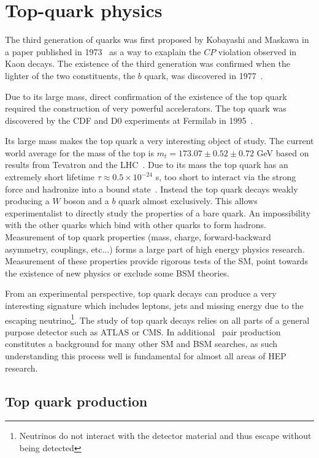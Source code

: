 \chapter{Top-quark physics} \label{sec:top_quark_physics}
The third generation of quarks was first proposed by Kobayashi and Maskawa in a paper published in 1973~\cite{Theory:CKMKobayashiMaskawa} as a way to exaplain the $CP$ violation observed in Kaon decays. The existence of the third generation was confirmed when the lighter of the two constituents, the $b$ quark, was discovered in 1977~\cite{Top:bQuarkDiscovered}.

Due to its large mass, direct confirmation of the existence of the top quark required the construction of very powerful accelerators. The top quark was discovered by the CDF and D0 experiments at Fermilab in 1995~\cite{Top:ObservationCDF,Top:ObservationD0}.

Its large mass makes the top quark a very interesting object of study. The current world average for the mass of the top is $m_{t}=173.07\pm0.52\pm0.72$ GeV based on results from Tevatron and the LHC~\cite{Theory:PDGBooklet}. Due to its mass the top quark has an extremely short lifetime $\tau\approx0.5\times10^{-24}$ s, too short to interact via the strong force and hadronize into a bound state~\cite{Theory:TopQuarkDecayTooQuickly}. Instead the top quark decays weakly producing a $W$ boson and a $b$ quark almost exclusively. This allows experimentalist to directly study the properties of a bare quark. An impossibility with the other quarks which bind with other quarks to form hadrons. Measurement of top quark properties (mass, charge, forward-backward asymmetry, couplings, etc...) forms a large part of high energy physics research. Measurement of these properties provide rigorous tests of the SM, point towards the existence of new physics or exclude some BSM theories.

From an experimental perspective, top quark decays can produce a very interesting signature which includes leptons, jets and missing energy due to the escaping neutrino\footnote{Neutrinos do not interact with the detector material and thus escape without being detected}. The study of top quark decays relies on all parts of a general purpose detector such as ATLAS or CMS. In additional \ttbar\ pair production constitutes a background for many other SM and BSM searches, as such understanding this process well is fundamental for almost all areas of HEP research.

\section{Top quark production} \label{sec:top_quark_production}

